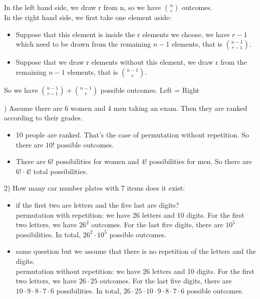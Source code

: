 \documentclass[12pt,a4paper,titlepage]{article}\usepackage[]{graphicx}\usepackage[]{color}
\begin{document}
\begin{enumerate}
In the left hand side, we draw r from n, so we have ${n \choose r}$ outcomes.\\
In the right hand side, we first take one element aside:
\begin{itemize}
\item Suppose that this element is inside the r elements we choose, we have $r-1$ which need to be drawn from the remaining $n-1$ elements, that is ${n-1 \choose r-1}$.
\item Suppose that we draw r elements without this element, we draw r from the remaining $n-1$ elements, that is ${n-1 \choose r}$.
\end{itemize}
So we have ${n-1 \choose r-1}+{n-1 \choose r}$ possible outcomes. Left = Right
\end{enumerate}

) Assume there are 6 women and 4 men taking an exam. Then they are ranked according to their grades.
\begin{itemize}
\item 10 people are ranked. That's the case of permutation without repetition. So there are $10!$ possible outcomes.
\item There are $6!$ possibilities for women and $4!$ possibilities for men. So there are $6!\cdot4!$ total possibilities.
\end{itemize}
2) How many car number plates with 7 items does it exist:
\begin{itemize}
  \item if the first two are letters and the five last are digits?\\
permutation with repetition: we have 26 letters and 10 digits. For the first two letters, we have $26^2$ outcomes. For the last five digits, there are $10^5$ possibilities. In total, $26^2\cdot10^5$ possible outcomes.

  \item same question but we assume that there is no repetition of the letters and the digits.\\
permutation without repetition: we have 26 letters and 10 digits. For the first two letters, we have $26\cdot25$ outcomes. For the last five digits, there are $10\cdot 9\cdot8\cdot7\cdot6$ possibilities. In total, $26\cdot25\cdot10\cdot 9\cdot8\cdot7\cdot6$ possible outcomes.

\end{itemize}
\end{document}
